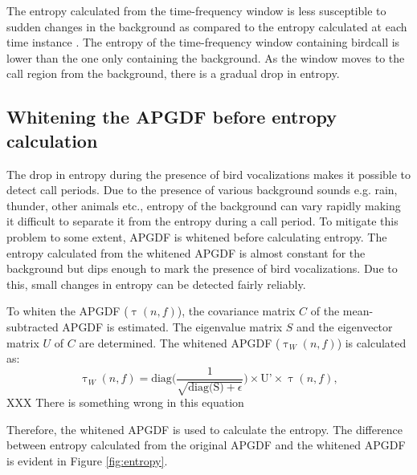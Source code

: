 \documentclass[a4paper]{article}
\begin{document}
The entropy calculated from the time-frequency window is less susceptible to sudden
changes in the background as compared to the entropy calculated at each time
instance \cite{wang2013}. The entropy of the time-frequency window containing
birdcall is lower than the one only containing the background. As the
window moves to the call region from the background, there is a gradual drop in
entropy. 




 


\subsection{Whitening the APGDF before entropy calculation}

The drop in entropy during the presence of bird vocalizations makes it possible
to detect call periods. Due to the presence of various background sounds e.g.
rain, thunder, other animals etc., entropy of the background can  vary rapidly
making it difficult to separate it from the entropy during a call period. To
mitigate this problem to some extent, APGDF is whitened  before calculating
entropy. The entropy calculated from the whitened APGDF is almost constant for
the background but dips enough to mark the presence of bird vocalizations. Due
to this, small changes in entropy can be detected fairly reliably.

To whiten the APGDF ($\uptau(n,f)$), the covariance matrix $C$ of the mean-subtracted
APGDF is estimated. The eigenvalue matrix $S$ and the eigenvector matrix
$U$ of $C$ are determined. The whitened APGDF
($\uptau_W(n,f)$) is calculated as:
\begin{equation}
\uptau_W(n,f)=\text{diag} \bigg(  \frac{1}{\sqrt{\text{diag(S)}+\epsilon}} 
\bigg )\times \text{U'} \times \uptau(n,f),
\end{equation}
XXX There is something wrong in this equation

Therefore, the whitened APGDF is used to calculate the entropy. The difference
between entropy calculated from the original APGDF and the whitened APGDF is
evident in Figure \ref{fig:entropy}.
\end{document}
